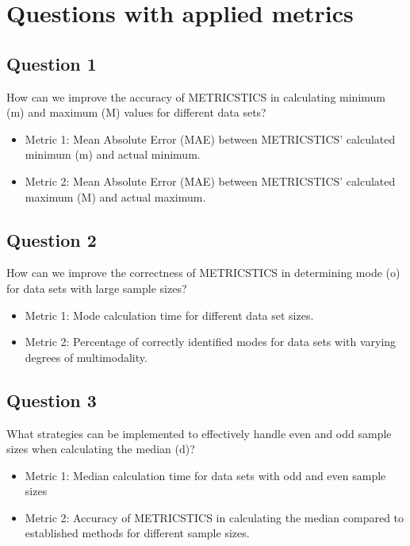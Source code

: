 \section{Questions with applied metrics}

\subsection*{Question 1}
How can we improve the accuracy of METRICSTICS in calculating  minimum (m) and maximum (M) values for different data sets?
\begin{itemize}
    \item Metric 1: Mean Absolute Error (MAE) between METRICSTICS' calculated minimum (m) and actual minimum.
    \item Metric 2: Mean Absolute Error (MAE) between METRICSTICS' calculated maximum (M) and actual maximum.
\end{itemize}

\subsection*{Question 2}
How can we improve the correctness of METRICSTICS in determining mode (o) for data sets with large sample sizes?
\begin{itemize}
    \item Metric 1: Mode calculation time for different data set sizes.
    \item Metric 2: Percentage of correctly identified modes for data sets with varying degrees of multimodality.
\end{itemize}

\subsection*{Question 3}
What strategies can be implemented to effectively handle even and odd sample sizes when calculating the median (d)?
\begin{itemize}
    \item Metric 1: Median calculation time for data sets with odd and even sample sizes
    \item Metric 2: Accuracy of METRICSTICS in calculating the median compared to established methods for different sample sizes.
\end{itemize}

